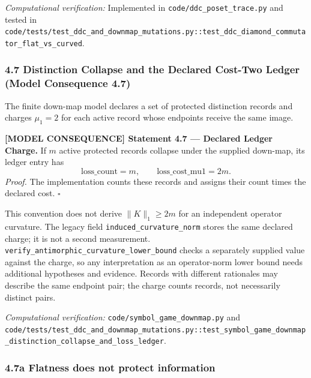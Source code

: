 \documentclass[
  english,
  10pt,
  a4paper,
]{article}
\renewenvironment{quote}
  {\begin{leftbar}\small}
  {\end{leftbar}}
\begin{document}
\emph{Computational verification:} Implemented in
\texttt{code/ddc\_poset\_trace.py} and tested in
\nolinkurl{code/tests/test_ddc_and_downmap_mutations.py::test_ddc_diamond_commutator_flat_vs_curved}.

\subsubsection{4.7 Distinction Collapse and the Declared Cost-Two Ledger
(Model Consequence
4.7)}\label{distinction-collapse-and-the-declared-cost-two-ledger-model-consequence-4.7}

The finite down-map model declares a set of protected distinction
records and charges \(\mu_1=2\) for each active record whose endpoints
receive the same image.

\begin{quote}
\textbf{{[}MODEL CONSEQUENCE{]} Statement 4.7 --- Declared Ledger
Charge.} If \(m\) active protected records collapse under the supplied
down-map, its ledger entry has \[
\mathrm{loss\_count}=m,\qquad \mathrm{loss\_cost\_mu1}=2m.
\] \emph{Proof.} The implementation counts these records and assigns
their count times the declared cost. \(\square\)
\end{quote}

This convention does not derive \(\|K\|_1\ge2m\) for an independent
operator curvature. The legacy field \texttt{induced\_curvature\_norm}
stores the same declared charge; it is not a second measurement.
\nolinkurl{verify_antimorphic_curvature_lower_bound} checks a separately
supplied value against the charge, so any interpretation as an
operator-norm lower bound needs additional hypotheses and evidence.
Records with different rationales may describe the same endpoint pair;
the charge counts records, not necessarily distinct pairs.

\emph{Computational verification:}
\nolinkurl{code/symbol_game_downmap.py} and
\nolinkurl{code/tests/test_ddc_and_downmap_mutations.py::test_symbol_game_downmap_distinction_collapse_and_loss_ledger}.

\subsubsection{4.7a Flatness does not protect
information}\label{a-flatness-does-not-protect-information}
\end{document}
